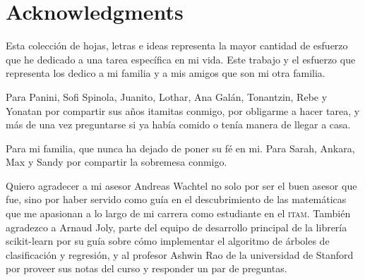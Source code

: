 {
    \chapter*{Acknowledgments}

    Esta colección de hojas, letras e ideas representa la mayor cantidad de
    esfuerzo que he dedicado a una tarea específica en mi vida. Este trabajo y
    el esfuerzo que representa los dedico a mi familia y a mis amigos que son mi
    otra familia.

    Para Panini, Sofi Spinola, Juanito, Lothar, Ana Galán, Tonantzin, Rebe y Yonatan por compartir sus años itamitas conmigo, por obligarme a hacer tarea, y
    más de una vez preguntarse si ya había comido o tenía manera de llegar a
    casa.
    
    Para mi familia, que nunca ha dejado de poner su fé en mi. Para Sarah,
    Ankara, Max y Sandy por compartir la sobremesa conmigo.
    

    \bigskip

    Quiero agradecer a mi asesor Andreas Wachtel no solo por ser el buen asesor
    que fue, sino por haber servido como guía en el descubrimiento de las
    matemáticas que me apasionan a lo largo de mi carrera como estudiante en el
    \textsc{itam}. También agradezco a Arnaud Joly, parte del equipo de
    desarrollo principal de la librería scikit-learn por su guía sobre cómo
    implementar el algoritmo de árboles de clasificación y regresión, y al
    profesor Ashwin Rao de la universidad de Stanford por proveer sus notas del
    curso y responder un par de preguntas.
}
\cleardoublepage